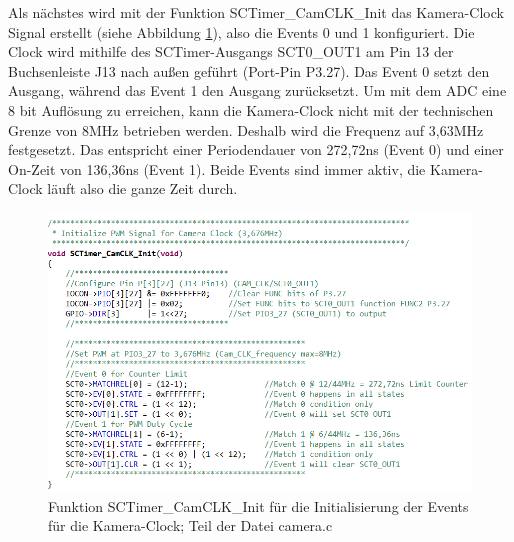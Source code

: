 Als nächstes wird mit der Funktion \glqq{}SCTimer\_CamCLK\_Init\grqq{} das Kamera-Clock Signal erstellt (siehe Abbildung \ref{fig:SCTimerCamCLKInit}), also die Events 0 und 1 konfiguriert. Die Clock wird mithilfe des SCTimer-Ausgangs SCT0\_OUT1 am Pin 13 der Buchsenleiste J13 nach außen geführt (Port-Pin P3.27). Das Event 0 setzt den Ausgang, während das Event 1 den Ausgang zurücksetzt. Um mit dem ADC eine 8 bit Auflösung zu erreichen, kann die Kamera-Clock nicht mit der technischen Grenze von 8MHz betrieben werden. Deshalb wird die Frequenz auf 3,63MHz festgesetzt. Das entspricht einer Periodendauer von 272,72ns (Event 0) und einer On-Zeit von 136,36ns (Event 1). Beide Events sind immer aktiv, die Kamera-Clock läuft also die ganze Zeit durch.\vspace{11pt}


\begin{figure}[H] %
\includegraphics[width=.95\textwidth]{sec7/images/code/SCTimerCamCLKInit} 
\centering
\captionsetup{width=.95\textwidth}
\caption[Funktion \glqq{}SCTimer\_CamCLK\_Init\grqq{} aus der Datei \glqq{}camera.c\grqq{}]{Funktion \glqq{}SCTimer\_CamCLK\_Init\grqq{} für die Initialisierung der Events für die Kamera-Clock; Teil der Datei \glqq{}camera.c\grqq{}}\centering
\label{fig:SCTimerCamCLKInit}
\end{figure}


